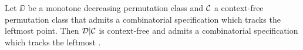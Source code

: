 \documentclass[12pt, a4paper, twoside]{report}
\providecommand{\DIFaddtex}[1]{{\protect\color{blue}\uwave{#1}}} %
\providecommand{\DIFaddbegin}{} %
\providecommand{\DIFaddend}{} %
\providecommand{\DIFdelbeginFL}{} %
\providecommand{\DIFadd}[1]{\texorpdfstring{\DIFaddtex{#1}}{#1}} %
\begin{document}
\begin{proposition}
  \label{prop:leftappend}
Let $\DD$ be a monotone decreasing permutation class and $\mathcal{C}$ a context-free permutation class that admits a combinatorial specification which tracks the leftmost point. Then $\mathcal{D}|\mathcal{C}$ is context-free and admits a combinatorial specification which tracks the leftmost \DIFaddbegin \DIFadd{point}\DIFaddend .
\end{proposition}
\begin{figure}[!ht]
  \centering
  \DIFdelbeginFL %






\end{figure}
\end{document}
